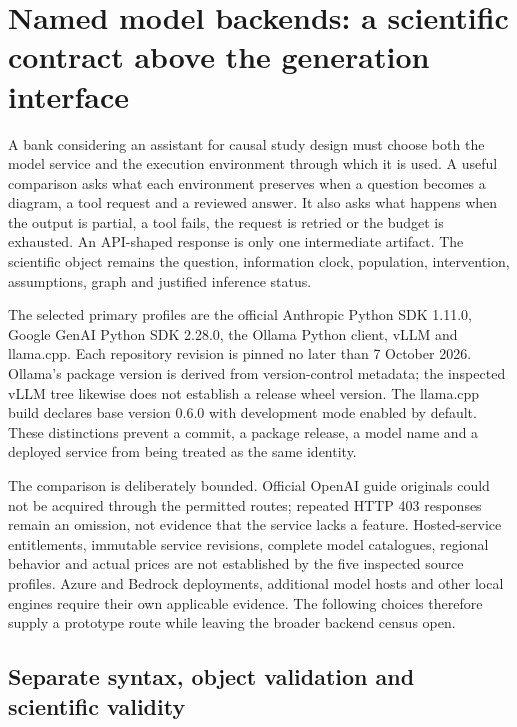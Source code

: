 \section{Named model backends: a scientific contract above the generation interface}
\label{sec:exec24-backend-census}

A bank considering an assistant for causal study design must choose both the
model service and the execution environment through which it is used. A useful
comparison asks what each environment preserves when a question becomes a
diagram, a tool request and a reviewed answer. It also asks what happens when
the output is partial, a tool fails, the request is retried or the budget is
exhausted. An API-shaped response is only one intermediate artifact. The
scientific object remains the question, information clock, population,
intervention, assumptions, graph and justified inference status.
\citep{exec24_backend_reference}

The selected primary profiles are the official Anthropic Python SDK 1.11.0,
Google GenAI Python SDK 2.28.0, the Ollama Python client, vLLM and llama.cpp.
Each repository revision is pinned no later than 7 October 2026. Ollama's
package version is derived from version-control metadata; the inspected
vLLM tree likewise does not establish a release wheel version. The llama.cpp
build declares base version 0.6.0 with development mode enabled by default.
These distinctions prevent a commit, a package release, a model name and a
deployed service from being treated as the same identity.
\citep{exec24_backend_anthropic,exec24_backend_google,exec24_backend_ollama,
exec24_backend_vllm,exec24_backend_llamacpp}

The comparison is deliberately bounded. Official OpenAI guide originals
could not be acquired through the permitted routes; repeated HTTP 403
responses remain an omission, not evidence that the service lacks a feature.
Hosted-service entitlements, immutable service revisions, complete model
catalogues, regional behavior and actual prices are not established by the
five inspected source profiles. Azure and Bedrock deployments, additional
model hosts and other local engines require their own applicable evidence.
The following choices therefore supply a prototype route while leaving the
broader backend census open.~\citep{exec24_backend_reference}

\subsection{Separate syntax, object validation and scientific validity}


